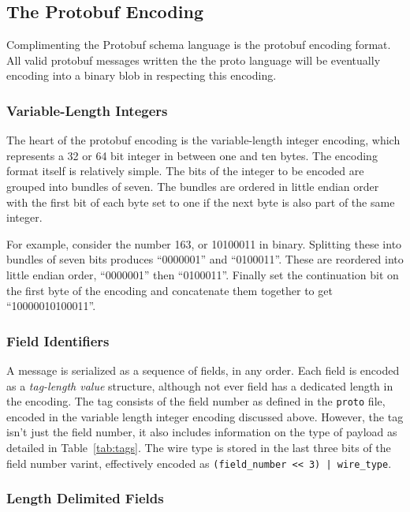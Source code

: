 \documentclass[11pt]{article}
\theoremstyle{definition}
\theoremstyle{plain}
\begin{document}
\subsection{The Protobuf Encoding}\label{sec:proto-enc}

Complimenting the Protobuf schema language is the protobuf encoding format. All
valid protobuf messages written the the proto language will be eventually
encoding into a binary blob in respecting this encoding.

\subsubsection{Variable-Length Integers}

The heart of the protobuf encoding is the variable-length integer encoding,
which represents a 32 or 64 bit integer in between one and ten bytes. The
encoding format itself is relatively simple. The bits of the integer to be
encoded are grouped into bundles of seven. The bundles are ordered in little
endian order with the first bit of each byte set to one if the next byte is also
part of the same integer.

For example, consider the number 163, or 10100011 in binary. Splitting these
into bundles of seven bits produces ``0000001'' and ``0100011''. These are
reordered into little endian order, ``0000001'' then ``0100011''. Finally set
the continuation bit on the first byte of the encoding and concatenate them
together to get ``10000010100011''.

\subsubsection{Field Identifiers}

A message is serialized as a sequence of fields, in any order. Each field is
encoded as a \emph{tag-length value} structure, although not ever field has a
dedicated length in the encoding. The tag consists of the field number as
defined in the \texttt{proto} file, encoded in the variable length integer
encoding discussed above. However, the tag isn't just the field number, it also
includes information on the type of payload as detailed in
Table~\ref{tab:tags}. The wire type is stored in the last three bits of the
field number varint, effectively encoded as \texttt{(field\_number << 3) |
  wire\_type}. 

\subsubsection{Length Delimited Fields}
\end{document}
